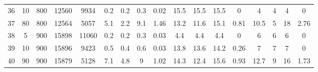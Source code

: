 \documentclass[11pt]{article}
\begin{document}
\begin{appendices}
\begin{landscape}
\begin{longtable}[c]{ccccc|cccc|cccc|cccc}
				36 & 10 & 800 & 12560 & 9934 & 0.2 & 0.2 & 0.3 & 0.02 & 15.5 & 15.5 & 15.5 & 0 & 4 & 4 & 4 & 0 \\
				37 & 80 & 800 & 12564 & 5057 & 5.1 & 2.2 & 9.1 & 1.46 & 13.2 & 11.6 & 15.1 & 0.81 & 10.5 & 5 & 18 & 2.76 \\
				\rowcolor[HTML]{EFEFEF} 
				38 & 5 & 900 & 15898 & 11060 & 0.2 & 0.2 & 0.3 & 0.03 & 4.4 & 4.4 & 4.4 & 0 & 6 & 6 & 6 & 0 \\
				\rowcolor[HTML]{EFEFEF} 
				39 & 10 & 900 & 15896 & 9423 & 0.5 & 0.4 & 0.6 & 0.03 & 13.8 & 13.6 & 14.2 & 0.26 & 7 & 7 & 7 & 0 \\
				\rowcolor[HTML]{EFEFEF} 
				40 & 90 & 900 & 15879 & 5128 & 7.1 & 4.8 & 9 & 1.02 & 14.3 & 12.4 & 15.6 & 0.93 & 12.7 & 9 & 16 & 1.73
			\end{longtable}
		\end{landscape}	
		
	\end{appendices}
\end{document}
